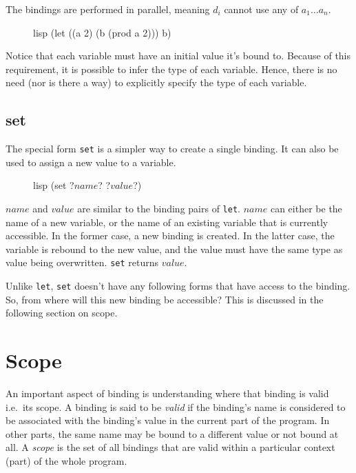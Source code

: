 \documentclass[a4paper, 12pt]{article}
\begin{document}
The bindings are performed in parallel, meaning $d_i$ cannot use any of $a_1 \ldots a_n$.

\begin{figure}[htp]
    \centering
    \begin{cminted}[autogobble=true]{lisp}
        (let ((a 2) (b (prod a 2))) b)
    \end{cminted}
    \captionsetup[figure]{font=small}
\end{figure}

Notice that each variable must have an initial value it's bound to. Because of this requirement, it is possible to infer the type of each variable. Hence, there is no need (nor is there a way) to explicitly specify the type of each variable.

\subsection{set}
The special form \texttt{set} is a simpler way to create a single binding. It can also be used to assign a new value to a variable.

\begin{figure}[htp]
    \centering
    \begin{cminted}[autogobble=true, escapeinside=??]{lisp}
        (set ?$name$? ?$value$?)
    \end{cminted}
    \captionsetup[figure]{font=small}
\end{figure}

$name$ and $value$ are similar to the binding pairs of \texttt{let}. $name$ can either be the name of a new variable, or the name of an existing variable that is currently accessible. In the former case, a new binding is created. In the latter case, the variable is rebound to the new value, and the value must have the same type as value being overwritten. \texttt{set} returns $value$.

Unlike \texttt{let}, \texttt{set} doesn't have any following forms that have access to the binding. So, from where will this new binding be accessible? This is discussed in the following section on scope.

\section{Scope} \label{sec:scope}
An important aspect of binding is understanding where that binding is valid i.e.\ its scope. A binding is said to be \textit{valid} if the binding's name is considered to be associated with the binding's value in the current part of the program. In other parts, the same name may be bound to a different value or not bound at all. A \textit{scope} is the set of all bindings that are valid within a particular context (part) of the whole program.
\end{document}

